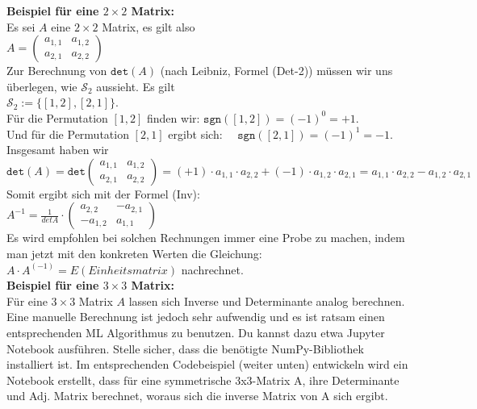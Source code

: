 \documentclass[12pt]{article}
\begin{document}
%
\textbf{Beispiel für eine $2 \times 2$ Matrix:}\\[0.2cm]
Es sei $A$ eine $2 \times 2$ Matrix, es gilt also
\\[0.2cm]
\hspace*{1.3cm}
$A = \left(
  \begin{array}{ll}
    a_{1,1} & a_{1,2} \\[0.2cm] 
    a_{2,1} & a_{2,2} 
  \end{array}
  \right)
$
\\[0.2cm]
Zur Berechnung von $\texttt{det}(A)$ (nach Leibniz, Formel (Det-2)) müssen wir uns überlegen, wie $ \mathcal{S}_2 $ aussieht.  Es gilt
\\[0.2cm]
\hspace*{1.3cm}
$\mathcal{S}_2 := \bigl\{ [1,2], [2,1] \bigr\}$.
\\[0.2cm]
Für die Permutation $[1,2]$ finden wir:  $\texttt{sgn}([1,2]) = (-1)^0 = +1$.
\\[0.2cm]
Und für die  Permutation $[2,1]$ ergibt sich: $ \quad \texttt{sgn}([2,1]) = (-1)^1 = -1 $.
\\[0.2cm]
Insgesamt haben wir
\\[0.2cm]
\hspace*{0.3cm}
$\texttt{det}(A) = \texttt{det}\left(\begin{array}{ll}
    a_{1,1} & a_{1,2} \\[0.2cm] 
    a_{2,1} & a_{2,2} 
  \end{array}
  \right)
  = (+1) \cdot a_{1,1} \cdot a_{2,2} + (-1) \cdot a_{1,2} \cdot a_{2,1} 
  = a_{1,1} \cdot a_{2,2} - a_{1,2} \cdot a_{2,1} $
Somit ergibt sich mit der Formel (Inv):\\[0.2cm]  
$ A^{-1} = \frac{1}{det A} \cdot \left(
  \begin{array}{ll}
    a_{2,2} & - a_{2,1} \\[0.2cm] 
    - a_{1,2} & a_{1,1} 
  \end{array}
  \right)
$ 
\\[0.4cm]
Es wird empfohlen bei solchen Rechnungen immer eine Probe zu machen, indem man jetzt mit den konkreten Werten die Gleichung: $A \cdot A^{(-1)} = E (Einheitsmatrix)$ nachrechnet.\\[0.3cm]
%
\textbf{Beispiel für eine $3 \times 3$ Matrix:}\\[0.2cm]
Für eine $3 \times 3$ Matrix $A$ lassen sich Inverse und Determinante analog berechnen.\\ Eine manuelle Berechnung ist jedoch sehr aufwendig und es ist ratsam einen entsprechenden ML Algorithmus zu benutzen. Du kannst dazu etwa  Jupyter Notebook ausführen. Stelle sicher, dass die benötigte NumPy-Bibliothek installiert ist. Im entsprechenden Codebeispiel (weiter unten) entwickeln wird ein Notebook erstellt, dass für eine symmetrische 3x3-Matrix A, ihre Determinante und Adj. Matrix berechnet, woraus sich die inverse Matrix von A sich ergibt.\\
\end{document}
